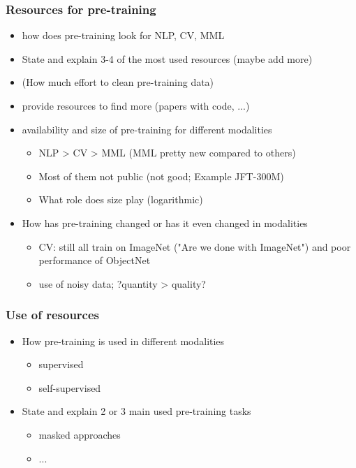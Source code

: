 \documentclass[
]{krantz}
\begin{document}
  \subsubsection{Resources for pre-training}
    \begin{itemize}
      \item how does pre-training look for NLP, CV, MML
      \item State and explain 3-4 of the most used resources (maybe add more)
      \item (How much effort to clean pre-training data)
      \item provide resources to find more (papers with code, ...)
      \item availability and size of pre-training for different modalities
        \begin{itemize}
          \item NLP > CV > MML (MML pretty new compared to others)
          \item Most of them not public (not good; Example JFT-300M)
          \item What role does size play (logarithmic)
        \end{itemize}
      \item How has pre-training changed or has it even changed in modalities
        \begin{itemize}
            \item CV: still all train on ImageNet ("Are we done with ImageNet") and poor performance of ObjectNet
            \item use of noisy data; ?quantity > quality?
          \end{itemize}
    \end{itemize}

\subsubsection{Use of resources}
    \begin{itemize}
      \item How pre-training is used in different modalities
        \begin{itemize}
          \item supervised
          \item self-supervised 
        \end{itemize}
        \item State and explain 2 or 3 main used pre-training tasks
          \begin{itemize}
            \item masked approaches
            \item ...
          \end{itemize}
      \end{itemize}
\end{document}
